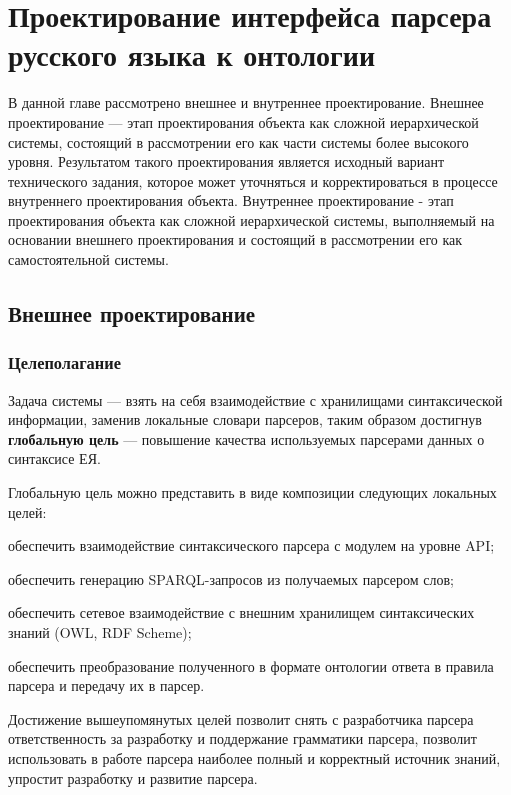 \indent \section{Проектирование интерфейса парсера русского языка к онтологии}

В данной главе  рассмотрено внешнее и внутреннее проектирование. Внешнее проектирование --- этап проектирования объекта как сложной иерархической системы, состоящий в рассмотрении его как части системы более высокого уровня. Результатом такого проектирования является исходный вариант технического задания, которое может уточняться и корректироваться в процессе внутреннего проектирования объекта. Внутреннее проектирование - этап проектирования объекта как сложной иерархической системы, выполняемый на основании внешнего проектирования и состоящий в рассмотрении его как самостоятельной системы.

\subsection{Внешнее проектирование}

\subsubsection{Целеполагание}

Задача системы --- взять на себя взаимодействие с хранилищами синтаксической информации, заменив локальные словари парсеров, таким образом достигнув \textbf{глобальную цель} --- повышение качества используемых парсерами данных о синтаксисе ЕЯ.

Глобальную цель можно представить в виде композиции следующих локальных целей:

\begin{list}{}{\leftmargin=1.5cm}
	\item обеспечить взаимодействие синтаксического парсера с модулем на уровне API;
	\item обеспечить генерацию SPARQL-запросов из получаемых парсером слов;
	\item обеспечить сетевое взаимодействие с внешним хранилищем синтаксических знаний (OWL, RDF Scheme);
	\item обеспечить преобразование полученного в формате онтологии ответа в правила парсера и передачу их в парсер.
\end{list}

Достижение вышеупомянутых целей позволит снять с разработчика парсера ответственность за разработку и поддержание грамматики парсера, позволит использовать в работе парсера наиболее полный и корректный источник знаний, упростит разработку и развитие парсера.

